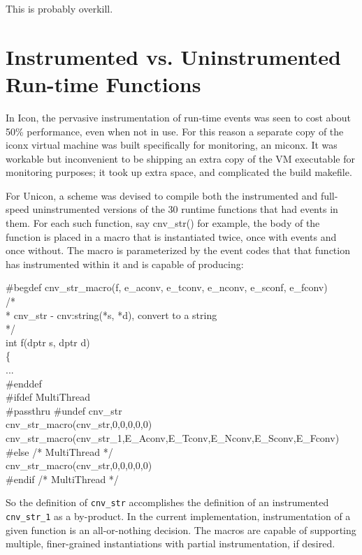 This is probably overkill.

\section{Instrumented vs. Uninstrumented Run-time Functions}

In Icon, the pervasive instrumentation of run-time events was seen to
cost about 50\% performance, even when not in use. For
this reason a separate copy of the iconx virtual machine was built
specifically for monitoring, an miconx.  It was workable but
inconvenient to be shipping an extra copy of the VM executable for
monitoring purposes; it took up extra space, and complicated the build
makefile.

For Unicon, a scheme was devised to compile both the instrumented and
full-speed uninstrumented versions of the 30 runtime functions that
had events in them.  For each such function, say cnv\_str() for
example, the body of the function is placed in a macro that is
instantiated twice, once with events and once without.  The macro is
parameterized by the event codes that that function has instrumented
within it and is capable of producing:

\begin{iconcode}
\#begdef cnv\_str\_macro(f, e\_aconv, e\_tconv, e\_nconv, e\_sconf, e\_fconv) \\
/* \\
 * cnv\_str - cnv:string(*s, *d), convert to a string \\
 */ \\
int f(dptr s, dptr d) \\
\>   \{ \\
\> ... \\
\> \#enddef
\ \\
\#ifdef MultiThread \\
\#passthru \#undef cnv\_str \\
cnv\_str\_macro(cnv\_str,0,0,0,0,0) \\
cnv\_str\_macro(cnv\_str\_1,E\_Aconv,E\_Tconv,E\_Nconv,E\_Sconv,E\_Fconv) \\
\#else					/* MultiThread */ \\
cnv\_str\_macro(cnv\_str,0,0,0,0,0) \\
\#endif					/* MultiThread */
\end{iconcode}

So the definition of \texttt{cnv\_str} accomplishes the definition of
an instrumented \texttt{cnv\_str\_1} as a by-product.  In the current
implementation, instrumentation of a given function is an
all-or-nothing decision. The macros are capable of supporting
multiple, finer-grained instantiations with partial instrumentation,
if desired.

